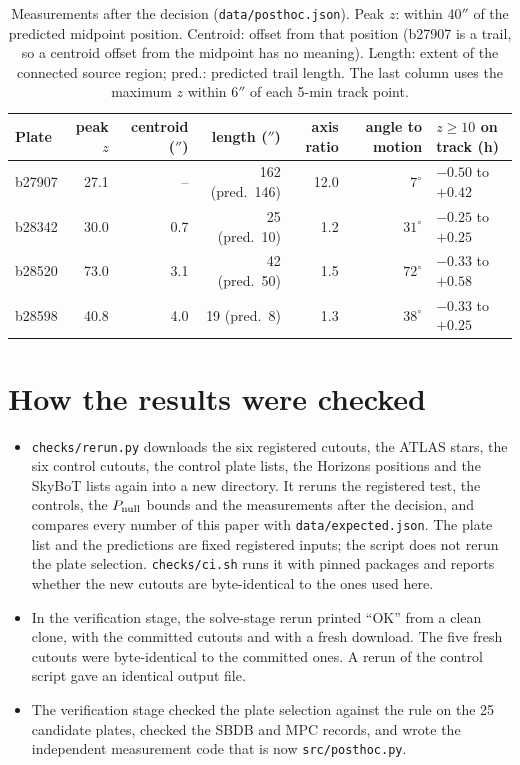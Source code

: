 \documentclass[11pt]{article}
\newcommand{\as}{$''$}
\begin{document}
\begin{table}[h]
\centering\small
\begin{tabular}{lrrrrrl}\toprule
Plate & peak $z$ & centroid (\as) & length (\as) & axis ratio & angle to motion & $z\ge10$ on track (h) \\\midrule
b27907 & 27.1 & -- & 162 (pred.\ 146) & 12.0 & $7^\circ$ & $-0.50$ to $+0.42$ \\
b28342 & 30.0 & 0.7 & 25 (pred.\ 10) & 1.2 & $31^\circ$ & $-0.25$ to $+0.25$ \\
b28520 & 73.0 & 3.1 & 42 (pred.\ 50) & 1.5 & $72^\circ$ & $-0.33$ to $+0.58$ \\
b28598 & 40.8 & 4.0 & 19 (pred.\ 8) & 1.3 & $38^\circ$ & $-0.33$ to $+0.25$ \\\bottomrule
\end{tabular}
\caption{Measurements after the decision (\texttt{data/posthoc.json}). Peak $z$: within 40\as{} of the predicted midpoint position. Centroid: offset from that position (b27907 is a trail, so a centroid offset from the midpoint has no meaning). Length: extent of the connected source region; pred.: predicted trail length. The last column uses the maximum $z$ within 6\as{} of each 5-min track point.}
\label{tab:post}
\end{table}

\section{How the results were checked}
\begin{itemize}
\item \texttt{checks/rerun.py} downloads the six registered cutouts, the ATLAS stars, the six control cutouts, the control plate lists, the Horizons positions and the SkyBoT lists again into a new directory. It reruns the registered test, the controls, the $P_{\rm null}$ bounds and the measurements after the decision, and compares every number of this paper with \texttt{data/expected.json}. The plate list and the predictions are fixed registered inputs; the script does not rerun the plate selection. \texttt{checks/ci.sh} runs it with pinned packages and reports whether the new cutouts are byte-identical to the ones used here.
\item In the verification stage, the solve-stage rerun printed ``OK'' from a clean clone, with the committed cutouts and with a fresh download. The five fresh cutouts were byte-identical to the committed ones. A rerun of the control script gave an identical output file.
\item The verification stage checked the plate selection against the rule on the 25 candidate plates, checked the SBDB and MPC records, and wrote the independent measurement code that is now \texttt{src/posthoc.py}.
\end{itemize}
\end{document}
